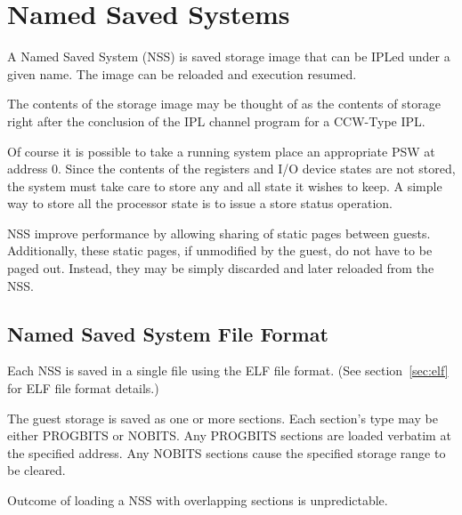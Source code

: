 \chapter{Named Saved Systems}
\label{chap:cp-nss}
\cbstart
{}

A Named Saved System (NSS) is saved storage image that can be IPLed under a
given name.  The image can be reloaded and execution resumed.

The contents of the storage image may be thought of as the contents of
storage right after the conclusion of the IPL channel program for a CCW-Type
IPL.

Of course it is possible to take a running system place an appropriate PSW
at address 0.  Since the contents of the registers and I/O device states are
not stored, the system must take care to store any and all state it wishes
to keep.  A simple way to store all the processor state is to issue a store
status operation.

NSS improve performance by allowing sharing of static pages between guests.
Additionally, these static pages, if unmodified by the guest, do not have to
be paged out.  Instead, they may be simply discarded and later reloaded from
the NSS.

\section{Named Saved System File Format}
Each NSS is saved in a single file using the ELF file format.  (See
section~\ref{sec:elf} for ELF file format details.)

The guest storage is saved as one or more sections. Each section's type may
be either PROGBITS or NOBITS.  Any PROGBITS sections are loaded verbatim at
the specified address.  Any NOBITS sections cause the specified storage
range to be cleared.

Outcome of loading a NSS with overlapping sections is unpredictable.
\cbend
